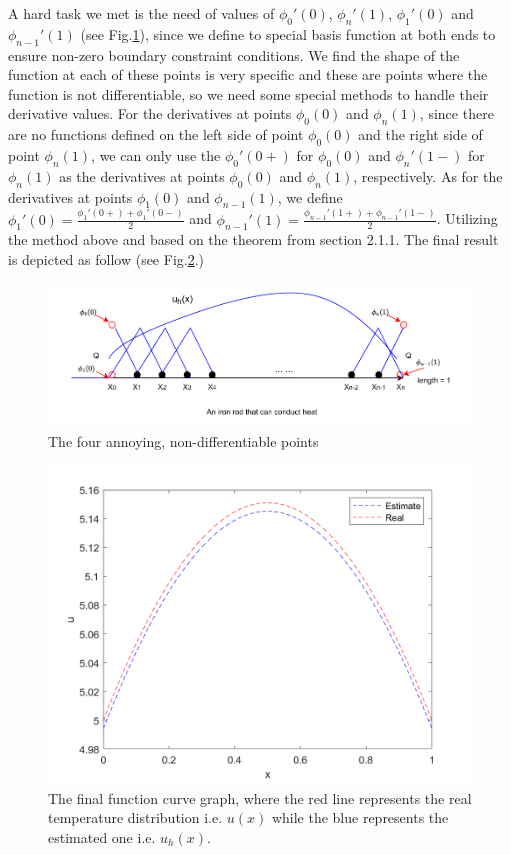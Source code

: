 \documentclass{article}
\begin{document}
    A hard task we met is the need of values of $\phi_0'(0)$, $\phi_{n}'(1)$, $\phi_1'(0)$ and $\phi_{n-1}'(1)$ (see Fig.\ref{pic_3}), since we define to special basis function at both ends to ensure non-zero boundary constraint conditions. We find the shape of the function at each of these points is very specific and these are points where the function is not differentiable, so we need some special methods to handle their derivative values. 
    For the derivatives at points $\phi_0(0)$ and $\phi_{n}(1)$, since there are no functions defined on the left side of point $\phi_0(0)$ and the right side of point $\phi_{n}(1)$, we can only use the $\phi_0'(0+)$ for $\phi_0(0)$ and $\phi_{n}'(1-)$ for $\phi_{n}(1)$ as the derivatives at points $\phi_0(0)$ and $\phi_{n}(1)$, respectively. As for the derivatives at points $\phi_1(0)$ and $\phi_{n-1}(1)$, we define $\phi_1'(0)=\frac{\phi_1'(0+)+\phi_1'(0-)}{2}$ and $\phi_{n-1}'(1)=\frac{\phi_{n-1}'(1+)+\phi_{n-1}'(1-)}{2}$. Utilizing the method above and based on the theorem from section 2.1.1. The final result is depicted as follow (see Fig.\ref{pic_4}.)
    \begin{figure}[H]
        \centering %
        \includegraphics[width=15cm]{pic/1.1.pdf} %
        \caption{The four annoying, non-differentiable points} %
        \label{pic_3}
    \end{figure}
    \begin{figure}[H]
        \centering %
        \includegraphics[width=12cm]{pic/result1.png} %
        \caption{The final function curve graph, where the red line represents the real temperature distribution i.e. $u(x)$ while the blue represents the estimated one i.e. $u_h(x)$.} %
        \label{pic_4}
    \end{figure}
\end{document}
